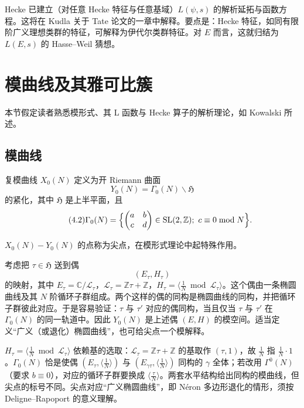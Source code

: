 Hecke 已建立（对任意 Hecke 特征与任意基域）$L(\psi,s)$ 的解析延拓与函数方程。这将在 Kudla 关于 Tate 论文的一章中解释。要点是：Hecke 特征，如同有限阶广义理想类群的特征，可解释为伊代尔类群特征。对 $E$ 而言，这就归结为 $L(E,s)$ 的 Hasse--Weil 猜想。
\section{模曲线及其雅可比簇}\label{c5:sec:4}

本节假定读者熟悉模形式、其 L 函数与 Hecke 算子的解析理论，如 Kowalski 所述。

\subsection{模曲线}\label{c5:sec:4.1}

复模曲线 $X_0(N)$ 定义为开 Riemann 曲面
\begin{equation}\tag{4.1}\label{c5:eq:4.1}
Y_0(N)=\Gamma_0(N)\backslash\mathfrak{H}
\end{equation}
的紧化，其中 $\mathfrak{H}$ 是上半平面，且
\begin{equation}\tag{4.2}\label{c5:eq:4.2}
\Gamma_0(N)=\Bigl\{\begin{pmatrix}a&b\\ c&d\end{pmatrix}\in\mathrm{SL}(2,\mathbb{Z});\ c\equiv0\bmod N\Bigr\}.
\end{equation}

$X_0(N)-Y_0(N)$ 的点称为尖点，在模形式理论中起特殊作用。

考虑把 $\tau\in\mathfrak{H}$ 送到偶
\begin{equation}\tag{4.3}\label{c5:eq:4.3}
(E_\tau,H_\tau)
\end{equation}
的映射，其中 $E_\tau=\mathbb{C}/\mathcal{L}_\tau$，$\mathcal{L}_\tau=\mathbb{Z}\tau+\mathbb{Z}$，$H_\tau=\langle\frac1N\bmod\mathcal{L}_\tau\rangle$。这个偶由一条椭圆曲线及其 $N$ 阶循环子群组成。两个这样的偶的同构是椭圆曲线的同构，并把循环子群彼此对应。于是容易验证：$\tau$ 与 $\tau'$ 对应的偶同构，当且仅当 $\tau$ 与 $\tau'$ 在 $\Gamma_0(N)$ 的同一轨道中。因此 $Y_0(N)$ 是上述偶 $(E,H)$ 的模空间。适当定义“广义（或退化）椭圆曲线”，也可给尖点一个模解释。

\begin{annote}
$H_\tau=\langle\frac1N\bmod\mathcal{L}_\tau\rangle$ 依赖基的选取：$\mathcal{L}_\tau=\mathbb{Z}\tau+\mathbb{Z}$ 的基取作 $(\tau,1)$，故 $\frac1N$ 指 $\frac1N\cdot1$。$\Gamma_0(N)$ 恰是使偶 $(E_\tau,\langle\frac1N\rangle)$ 与 $(E_{\gamma\tau},\langle\frac1N\rangle)$ 同构的 $\gamma$ 全体；若改用 $\Gamma^0(N)$（要求 $b\equiv0$），对应的循环子群要换成 $\langle\frac{\tau}{N}\rangle$。两套水平结构给出同构的模曲线，但尖点的标号不同。尖点对应“广义椭圆曲线”，即 Néron 多边形退化的情形，须按 Deligne--Rapoport 的意义理解。
\par\vspace{0.15em}{\raggedleft 【来源：Diamond--Shurman《A First Course in Modular Forms》第 8 章（A）；Deligne--Rapoport《Les schémas de modules de courbes elliptiques》（A）】\par}
\end{annote}


